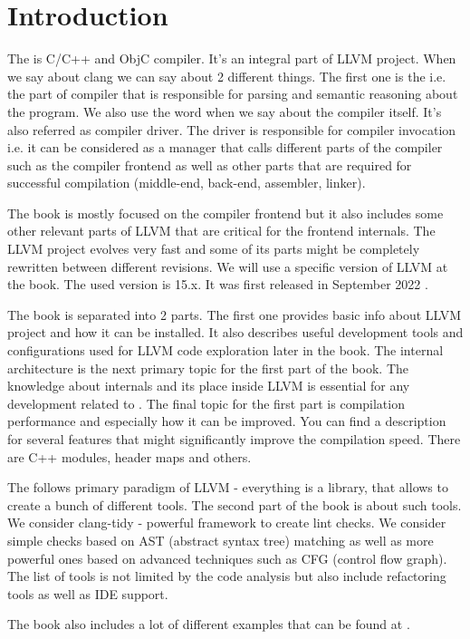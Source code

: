 \chapter*{Introduction}

The \clang is C/C++ and ObjC compiler. It's an
integral part of LLVM 
project. When we say about clang we can say about 2 different
things. The first one is the  i.e. the part of
compiler that is responsible for parsing and semantic reasoning about
the program. We also use the word \clang when we say
about the compiler itself. It's also referred as compiler driver. The
driver is responsible for compiler invocation i.e. it can be
considered as a manager that calls different parts of the
compiler such as the compiler
frontend as well as other parts that are required for successful
compilation (middle-end, back-end, assembler, linker).

The book is mostly focused on the \clang compiler
frontend but it also includes some other relevant parts of
LLVM that are critical for the frontend internals. The LLVM project evolves
very fast and some of its parts might be completely rewritten between different
revisions. We will use a specific version of LLVM at the book. The used version
is 15.x. It was first released in September 2022
\cite{llvm:releases} \label{c:release15}.  

The book is separated into 2 parts. The first one provides basic
info about LLVM project and how it can be installed. It also describes
useful development tools and configurations used for LLVM code
exploration later in the book. The internal \clang architecture is the next
primary topic for the first part of the book. The knowledge about \clang
internals and its place inside LLVM is essential for any development related to
\clang. The final topic for the first part is compilation performance and
especially how it can be improved. You can find a description for several \clang
features that might significantly improve the compilation speed. There are C++
modules, header maps and others. 

The \clang follows primary paradigm of LLVM -
everything is a library, that allows to create a bunch of different
tools. The second part of the book is about such tools. We consider clang-tidy -
powerful framework to create lint checks. We consider simple checks based on AST
(abstract syntax tree) matching as well as more powerful ones based on advanced
techniques such as CFG (control flow graph). The list of tools is not limited by
the code analysis but also include refactoring tools as well as IDE support.


The book also includes a lot of different examples that can be found at
\cite{github:clangbook_src}.
